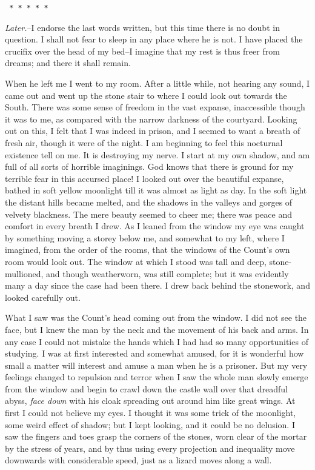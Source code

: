 \documentclass[12pt,openright]{book}
\begin{document}
\texttt{   *       *       *       *       *}

\textit{Later.}–I endorse the last words written, but this time there is no doubt in question. I shall not fear to sleep in any place where he is not. I have placed the crucifix over the head of my bed–I imagine that my rest is thus freer from dreams; and there it shall remain.

When he left me I went to my room. After a little while, not hearing any sound, I came out and went up the stone stair to where I could look out towards the South. There was some sense of freedom in the vast expanse, inaccessible though it was to me, as compared with the narrow darkness of the courtyard. Looking out on this, I felt that I was indeed in prison, and I seemed to want a breath of fresh air, though it were of the night. I am beginning to feel this nocturnal existence tell on me. It is destroying my nerve. I start at my own shadow, and am full of all sorts of horrible imaginings. God knows that there is ground for my terrible fear in this accursed place! I looked out over the beautiful expanse, bathed in soft yellow moonlight till it was almost as light as day. In the soft light the distant hills became melted, and the shadows in the valleys and gorges of velvety blackness. The mere beauty seemed to cheer me; there was peace and comfort in every breath I drew. As I leaned from the window my eye was caught by something moving a storey below me, and somewhat to my left, where I imagined, from the order of the rooms, that the windows of the Count’s own room would look out. The window at which I stood was tall and deep, stone-mullioned, and though weatherworn, was still complete; but it was evidently many a day since the case had been there. I drew back behind the stonework, and looked carefully out.

What I saw was the Count’s head coming out from the window. I did not see the face, but I knew the man by the neck and the movement of his back and arms. In any case I could not mistake the hands which I had had so many opportunities of studying. I was at first interested and somewhat amused, for it is wonderful how small a matter will interest and amuse a man when he is a prisoner. But my very feelings changed to repulsion and terror when I saw the whole man slowly emerge from the window and begin to crawl down the castle wall over that dreadful abyss, \textit{face down} with his cloak spreading out around him like great wings. At first I could not believe my eyes. I thought it was some trick of the moonlight, some weird effect of shadow; but I kept looking, and it could be no delusion. I saw the fingers and toes grasp the corners of the stones, worn clear of the mortar by the stress of years, and by thus using every projection and inequality move downwards with considerable speed, just as a lizard moves along a wall.
\end{document}
